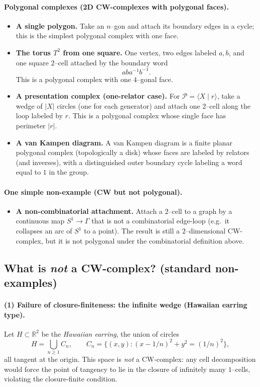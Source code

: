 \documentclass[11pt]{article}
\theoremstyle{definition}
\theoremstyle{plain}
\theoremstyle{remark}
\begin{document}
\paragraph{Polygonal complexes (2D CW-complexes with polygonal faces).}
\begin{itemize}[leftmargin=2em]
\item \textbf{A single polygon.}
Take an $n$--gon and attach its boundary edges in a cycle; this is the simplest polygonal complex with one face.

\item \textbf{The torus $T^2$ from one square.}
One vertex, two edges labeled $a,b$, and one square $2$--cell attached by the boundary word
\[
aba^{-1}b^{-1}.
\]
This is a polygonal complex with one $4$--gonal face.

\item \textbf{A presentation complex (one-relator case).}
For $\mathcal P=\langle X\mid r\rangle$, take a wedge of $|X|$ circles (one for each generator) and attach one $2$--cell along the loop labeled by $r$.
This is a polygonal complex whose single face has perimeter $|r|$.

\item \textbf{A van Kampen diagram.}
A van Kampen diagram is a finite planar polygonal complex (topologically a disk) whose faces are labeled by relators (and inverses),
with a distinguished outer boundary cycle labeling a word equal to $1$ in the group.
\end{itemize}

\paragraph{One simple non-example (CW but not polygonal).}
\begin{itemize}[leftmargin=2em]
\item \textbf{A non-combinatorial attachment.}
Attach a $2$--cell to a graph by a continuous map $S^1\to \Gamma$ that is not a combinatorial edge-loop
(e.g.\ it collapses an arc of $S^1$ to a point).
The result is still a $2$--dimensional CW-complex, but it is not polygonal under the combinatorial definition above.
\end{itemize}

\subsection*{What is \emph{not} a CW-complex? (standard non-examples)}

\paragraph{(1) Failure of closure-finiteness: the infinite wedge (Hawaiian earring type).}
Let $H\subset \mathbb{R}^2$ be the \emph{Hawaiian earring}, the union of circles
\[
H=\bigcup_{n\ge 1} C_n,\qquad
C_n=\{(x,y): (x-1/n)^2+y^2=(1/n)^2\},
\]
all tangent at the origin.
This space is \emph{not} a CW-complex: any cell decomposition would force the point of tangency to lie in the closure
of infinitely many $1$--cells, violating the closure-finite condition.
\end{document}
